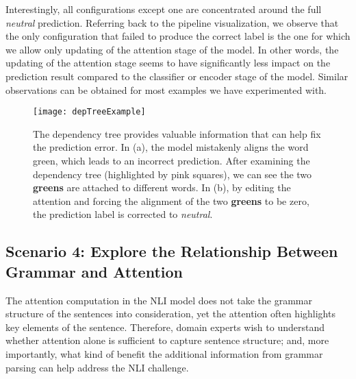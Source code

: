 Interestingly, all configurations except one are concentrated around the full \emph{neutral} prediction. Referring back to the pipeline visualization, we observe that the only configuration that failed to produce the correct label is the one for which we allow only updating of the attention stage of the model.
%
In other words, the updating of the attention stage seems to have significantly less impact on the prediction result compared to the classifier or encoder stage of the model. Similar observations can be obtained for most examples we have experimented with.

%
\begin{figure*}[t]
\centering
\vspace{-2mm}
 \texttt{[image: depTreeExample]}
  \vspace{-6mm}
 \caption{
The dependency tree provides valuable information that can help fix the prediction error.
In (a), the model mistakenly aligns the word green, which leads to an incorrect prediction.  
After examining the dependency tree (highlighted by pink squares), we can see the two \textbf{greens} are attached to different words.
In (b), by editing the attention and forcing the alignment of the two \textbf{greens} to be zero, the prediction label is corrected to \emph{neutral}. 
 }
\label{fig:depTreeExample}
 \vspace{-4mm}
\end{figure*}

\subsection{Scenario 4: Explore the Relationship Between Grammar and Attention}
\label{sec:grammarAttention}
The attention computation in the NLI model does not take the grammar structure of the sentences into consideration,
yet the attention often highlights key elements of the sentence. 
Therefore, domain experts wish to understand whether attention alone is sufficient to capture sentence structure; 
and, more importantly, what kind of benefit the additional information from grammar parsing can help address the NLI challenge.

